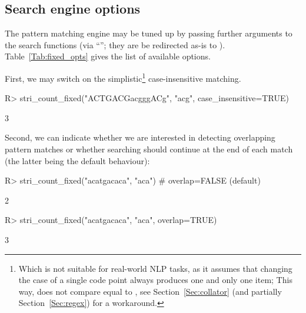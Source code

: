 \documentclass[nojss]{jss}\usepackage[]{graphicx}\usepackage[]{color}
\begin{document}
\subsection{Search engine options}

The pattern matching engine may be tuned up by passing
further arguments to the search functions (via ``'';
they are be redirected as-is to ).
Table~\ref{Tab:fixed_opts} gives the list of available options.





First, we may switch on the simplistic\footnote{Which is not suitable
for real-world NLP tasks, as it assumes
that changing the case of a single code point always produces one and only
one item;
This way,  does not compare equal to ,
see Section~\ref{Sec:collator} (and partially Section~\ref{Sec:regex}) for a workaround.}
case-insensitive matching.


\begin{Schunk}
\begin{Sinput}
R> stri_count_fixed("ACTGACGacgggACg", "acg", case_insensitive=TRUE)
\end{Sinput}
\begin{Soutput}
[1] 3
\end{Soutput}
\end{Schunk}

Second, we can indicate whether we are interested in detecting
overlapping pattern matches or whether searching should continue
at the end of each match
(the latter being the default behaviour):

\begin{Schunk}
\begin{Sinput}
R> stri_count_fixed("acatgacaca", "aca")  # overlap=FALSE (default)
\end{Sinput}
\begin{Soutput}
[1] 2
\end{Soutput}
\begin{Sinput}
R> stri_count_fixed("acatgacaca", "aca", overlap=TRUE)
\end{Sinput}
\begin{Soutput}
[1] 3
\end{Soutput}
\end{Schunk}
\end{document}
